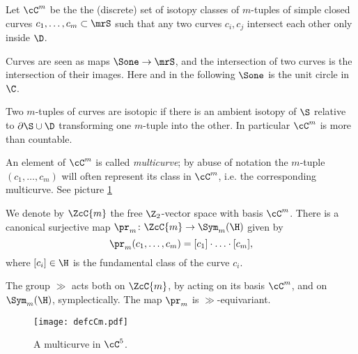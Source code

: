 \begin{defn}
\label{defn:cCm}
Let $\cC^m$ be the the (discrete) set of isotopy classes of $m$-tuples of simple closed curves $c_1,\dots,c_m\subset\mrS$
such that any two curves $c_i,c_j$ intersect each other only inside $\D$.
 
Curves are seen as maps $\Sone\to\mrS$, and the intersection of two curves is the intersection of their
images. Here and in the following $\Sone$ is the unit circle in $\C$.

Two $m$-tuples of curves are isotopic if there is an ambient isotopy of $\S$ relative to $\partial\S\cup\D$
transforming one $m$-tuple into the other. In particular $\cC^m$ is more than countable.

An element of $\cC^m$ is called \emph{multicurve}; by abuse of notation the $m$-tuple
$(c_1,\dots,c_m)$ will often represent its class in $\cC^m$, i.e. the corresponding multicurve.
See picture \ref{fig:defcCm}

We denote by $\ZcC{m}$ the free $\Z_2$-vector space with basis $\cC^m$.
There is a canonical surjective map $\pr_m\colon\ZcC{m}\to\Sym_m(\H)$ given by
\[
 \pr_m(c_1,\dots,c_m)=[c_1]\cdot\ldots\cdot[c_m],
\]
where $[c_i]\in\H$ is the fundamental class of the curve $c_i$.

The group $\gg$ acts both on $\ZcC{m}$, by acting on its basis $\cC^m$, and
on $\Sym_m(\H)$, symplectically. The map $\pr_m$ is $\gg$-equivariant.
\end{defn}

\begin{figure}\centering
 \texttt{[image: defcCm.pdf]}
 \caption{A multicurve in $\cC^5$.}
\label{fig:defcCm}
\end{figure}

